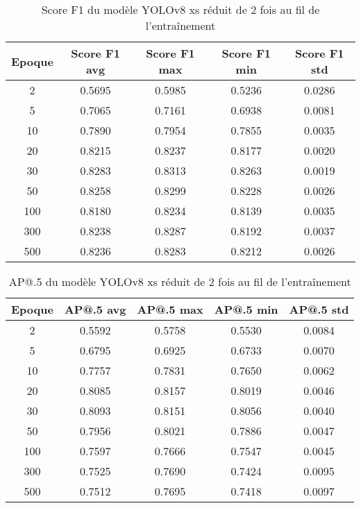 \begin{table}[!ht]
    \caption{Score F1 du modèle YOLOv8 xs réduit de 2 fois au fil de l'entraînement}
    \label{tab:yolov8xs_reduced2x_f1score}
    \centering
    \begin{tabular}{ |c||c|c|c|c|  }
        \hline
        \rowcolor{gray!50}
        Epoque & Score F1 avg & Score F1 max & Score F1 min & Score F1 std\\
        \hline
        2 & 0.5695 & 0.5985 & 0.5236 & 0.0286\\
        5 & 0.7065 & 0.7161 & 0.6938 & 0.0081\\
        10 & 0.7890 & 0.7954 & 0.7855 & 0.0035\\
        20 & 0.8215 & 0.8237 & 0.8177 & 0.0020\\
        30 & 0.8283 & 0.8313 & 0.8263 & 0.0019\\
        50 & 0.8258 & 0.8299 & 0.8228 & 0.0026\\
        100 & 0.8180 & 0.8234 & 0.8139 & 0.0035\\
        300 & 0.8238 & 0.8287 & 0.8192 & 0.0037\\
        500 & 0.8236 & 0.8283 & 0.8212 & 0.0026\\
        \hline
    \end{tabular}
\end{table}

\begin{table}[!ht]
    \caption{AP@.5 du modèle YOLOv8 xs réduit de 2 fois au fil de l'entraînement}
    \label{tab:yolov8xs_reduced2x_ap50}
    \centering
    \begin{tabular}{ |c||c|c|c|c|  }
        \hline
        \rowcolor{gray!50}
        Epoque & AP@.5 avg & AP@.5 max & AP@.5 min & AP@.5 std\\
        \hline
        2 & 0.5592 & 0.5758 & 0.5530 & 0.0084\\
        5 & 0.6795 & 0.6925 & 0.6733 & 0.0070\\
        10 & 0.7757 & 0.7831 & 0.7650 & 0.0062\\
        20 & 0.8085 & 0.8157 & 0.8019 & 0.0046\\
        30 & 0.8093 & 0.8151 & 0.8056 & 0.0040\\
        50 & 0.7956 & 0.8021 & 0.7886 & 0.0047\\
        100 & 0.7597 & 0.7666 & 0.7547 & 0.0045\\
        300 & 0.7525 & 0.7690 & 0.7424 & 0.0095\\
        500 & 0.7512 & 0.7695 & 0.7418 & 0.0097\\
        \hline
    \end{tabular}
\end{table}

